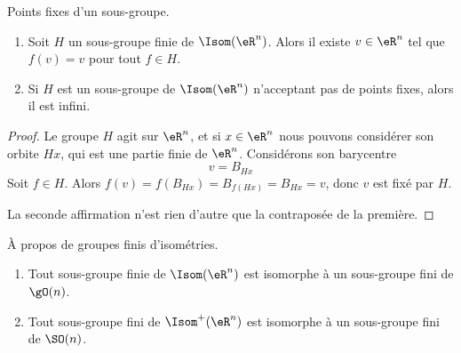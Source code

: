 \begin{proposition}     \label{PROPooLAEBooWdcBoe}
    Points fixes d'un sous-groupe.
    \begin{enumerate}
        \item
            Soit \( H\) un sous-groupe finie de \( \Isom(\eR^n)\). Alors il existe \( v\in \eR^n\) tel que \( f(v)=v\) pour tout \( f\in H\).
        \item
            Si \( H\) est un sous-groupe de \( \Isom(\eR^n)\) n'acceptant pas de points fixes, alors il est infini.
    \end{enumerate}
\end{proposition}

\begin{proof}
    Le groupe \( H\) agit sur \( \eR^n\), et si \( x\in \eR^n\) nous pouvons considérer son orbite \( Hx\), qui est une partie finie de \( \eR^n\). Considérons son barycentre
    \begin{equation}
        v=B_{Hx}
    \end{equation}
    Soit \( f\in H\). Alors \( f(v)=f(B_{Hx})=B_{f(Hx)}=B_{Hx}=v\), donc \( v\) est fixé par \( H\).

    La seconde affirmation n'est rien d'autre que la contraposée de la première.
\end{proof}

\begin{proposition}     \label{PROPooEUFIooDUIYzi}
    À propos de groupes finis d'isométries.
    \begin{enumerate}
        \item
            Tout sous-groupe finie de \( \Isom(\eR^n)\) est isomorphe à un sous-groupe fini de \( \gO(n)\).
        \item
            Tout sous-groupe fini de \( \Isom^+(\eR^n)\) est isomorphe à un sous-groupe fini de \( \SO(n)\).
    \end{enumerate}
\end{proposition}

